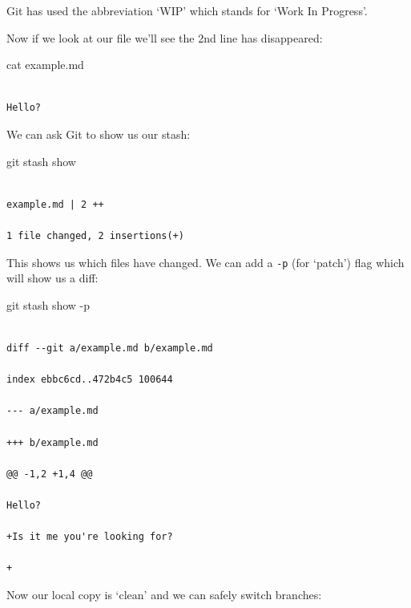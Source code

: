 \documentclass[
  letterpaper,
  DIV=11,
  numbers=noendperiod]{scrartcl}
\newenvironment{Shaded}{\begin{snugshade}}{\end{snugshade}}
\newcommand{\AttributeTok}[1]{\textcolor[rgb]{0.40,0.45,0.13}{#1}}
\newcommand{\FunctionTok}[1]{\textcolor[rgb]{0.28,0.35,0.67}{#1}}
\newcommand{\NormalTok}[1]{\textcolor[rgb]{0.00,0.23,0.31}{#1}}
\begin{document}
Git has used the abbreviation `WIP' which stands for `Work In Progress'.

Now if we look at our file we'll see the 2nd line has disappeared:

\begin{Shaded}
\begin{Highlighting}[]
\FunctionTok{cat}\NormalTok{ example.md}
\end{Highlighting}
\end{Shaded}

\begin{verbatim}

Hello?
\end{verbatim}

We can ask Git to show us our stash:

\begin{Shaded}
\begin{Highlighting}[]
\FunctionTok{git}\NormalTok{ stash show}
\end{Highlighting}
\end{Shaded}

\begin{verbatim}

example.md | 2 ++

1 file changed, 2 insertions(+)
\end{verbatim}

This shows us which files have changed. We can add a \texttt{-p} (for
`patch') flag which will show us a diff:

\begin{Shaded}
\begin{Highlighting}[]
\FunctionTok{git}\NormalTok{ stash show }\AttributeTok{{-}p}
\end{Highlighting}
\end{Shaded}

\begin{verbatim}

diff --git a/example.md b/example.md

index ebbc6cd..472b4c5 100644

--- a/example.md

+++ b/example.md

@@ -1,2 +1,4 @@

Hello?

+Is it me you're looking for?

+
\end{verbatim}

Now our local copy is `clean' and we can safely switch branches:
\end{document}
